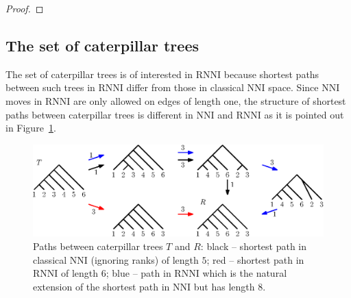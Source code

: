 \documentclass[11pt, a4paper]{article}
\newcommand{\nni}{\mathrm{NNI}}
\newcommand{\rnni}{\mathrm{RNNI}}
\begin{document}
\begin{proof}
\end{proof}


\subsection{The set of caterpillar trees}
\label{section:caterpillar_convex}

The set of caterpillar trees is of interested in $\rnni$ because shortest paths between such trees in $\rnni$ differ from those in classical $\nni$ space.
Since $\nni$ moves in $\rnni$ are only allowed on edges of length one, the structure of shortest paths between caterpillar trees is different in $\nni$ and $\rnni$ as it is pointed out in Figure~\ref{fig:NNI_vs_RNNI}.

\begin{figure}[H]
	\centering
	\includegraphics[width=\textwidth]{NNI_vs_RNNI}
	\caption{Paths between caterpillar trees $T$ and $R$: black -- shortest path in classical $\nni$ (ignoring ranks) of length $5$; red -- shortest path in $\rnni$ of length $6$; blue -- path in $\rnni$ which is the natural extension of the shortest path in $\nni$ but has length $8$.}
	\label{fig:NNI_vs_RNNI}
\end{figure}
\end{document}
